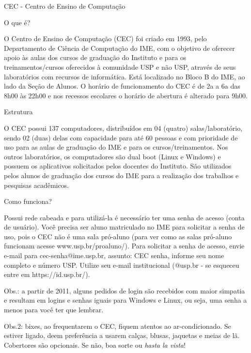 \begin{secao}{CEC - Centro de Ensino de Computação}

\begin{subsecao}{O que é?}

O Centro de Ensino de Computação (CEC) foi criado em 1993, pelo
Departamento de Ciência de Computação do IME, com o objetivo de
oferecer apoio às aulas dos cursos de graduação do Instituto e para os
treinamentos/cursos oferecidos à comunidade USP e não USP, através de
seus laboratórios com recursos de informática.
Está localizado no Bloco B do IME, ao lado da Seção de Alunos. O horário
de funcionamento do CEC é de 2a a 6a das 8h00 às 22h00 e nos recessos
escolares o horário de abertura é alterado para 9h00.

\end{subsecao}

\begin{subsecao}{Estrutura}

O CEC possui 137 computadores, distribuídos em 04 (quatro)
salas/laboratório, sendo 02 (duas) delas com capacidade para até 60
pessoas e com prioridade de uso para as aulas de graduação do IME e
para os cursos/treinamentos.
Nos outros laboratórios, os computadores são dual boot (Linux e Windows) e
possuem os aplicativos solicitados pelos docentes do Instituto. São
utilizados pelos alunos de graduação dos cursos do IME para a realização
dos trabalhos e pesquisas acadêmicos.

\end{subsecao}

\begin{subsecao}{Como funciona?}

Possui rede cabeada e para utilizá-la é necessário ter uma senha de
acesso (conta de usuário). Você precisa ser aluno matriculado no IME para
solicitar a senha de uso, pois o CEC não é uma sala pró-aluno (para ver
como as salas pró-aluno funcionam acesse www.usp.br/proaluno/). 
Para solicitar a senha de acesso, envie e-mail para cec-senha@ime.usp.br,
assunto: CEC senha, informe seu nome completo e número USP. Utilize
seu e-mail institucional (@usp.br - se esqueceu entre em
https://id.usp.br/).

\end{subsecao}

Obs.: a partir de 2011, alguns pedidos de login são recebidos com maior simpatia
e resultam em logins e senhas iguais para Windows e Linux, ou seja, uma senha a
menos para você ter que lembrar.

Obs.2: bixes, ao frequentarem o CEC, fiquem atentos ao ar-condicionado. Se
estiver ligado, deem preferência a usarem calças, blusas, jaquetas e meias de
lã. Cobertores são opcionais. Se não, boa sorte ou \textit{hasta la vista}!

\end{secao}
